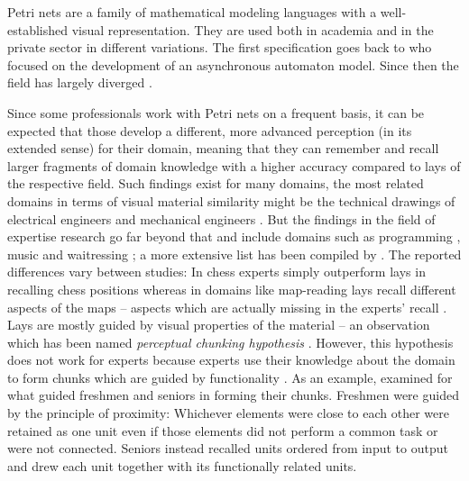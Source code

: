 
Petri nets are a family of mathematical modeling languages with a well-\-established visual representation.
They are used both in academia \cite{desel2001petri} and in the private sector \cite{desrochers1995applications} in different variations.
The first specification goes back to \textcite{carl1962petri} who focused on the development of an asynchronous automaton model.
Since then the field has largely diverged \cite{desel2001petri}. 

Since some professionals work with Petri nets on a frequent basis, it can be expected that those develop a different, more advanced perception (in its extended sense) for their domain, meaning that they can remember and recall larger fragments of domain knowledge with a higher accuracy compared to lays of the respective field.
Such findings exist for many domains, the most related domains in terms of visual material similarity might be the technical drawings of electrical engineers \cite{egan1979chunking} and mechanical engineers \cite{moss2006role}.
But the findings in the field of expertise research go far beyond that and include domains such as programming \cite{sheinderman1976exploratory}, music \cite{sloboda1976music} and waitressing \cite{ericsson1988experimental};
a more extensive list has been compiled by \textcite{oulasvirta2006surviving}.
The reported differences vary between studies:
In chess experts simply outperform lays in recalling chess positions \cite{gobet1996templates} whereas in domains like map-reading lays recall different aspects of the maps -- aspects which are actually missing in the experts' recall \cite{gilhooly1988skill}.
Lays are mostly guided by visual properties of the material \cite{canham2010effects,moss2006role,egan1979chunking} -- an observation which has been named \textit{perceptual chunking hypothesis} \cite{simon1973simulation}.
However, this hypothesis does not work for experts because experts use their knowledge about the domain to form chunks which are guided by functionality \cite{moss2006role,egan1979chunking}.
As an example,  examined for what guided freshmen and seniors in forming their chunks.
Freshmen were guided by the principle of proximity:
Whichever elements were close to each other were retained as one unit even if those elements did not perform a common task or were not connected.
Seniors instead recalled units ordered from input to output and drew each unit together with its functionally related units.

